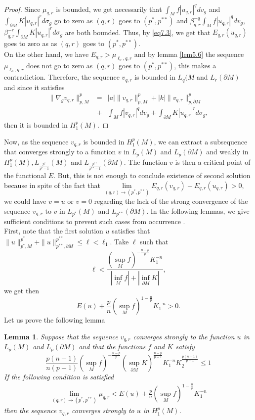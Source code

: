 \documentclass{Tran-l}
\newtheorem{lem}[thm]{Lemma}
\theoremstyle{definition}
\theoremstyle{remark}
\numberwithin{equation}{section}
\begin{document}
\begin{proof}
Since $\mu_{q,r}$ is bounded, we get necessarily that
$\int_Mf|u_{q,r}|^qdv_g$  and $\int_{\partial
M}K|u_{q,r}|^rd\sigma_g$ go to zero  as $(q,r)$ goes to
$(p^*,p^{**})$ and $\beta_{q,r}^{-q}\int_Mf|u_{q,r}|^qdv_g$,
$\beta_{q,r}^{-r}\int_{\partial M}K|u_{q,r}|^rd\sigma_g$ are both
bounded. Thus, by \eqref{eq7.3}, we get that $E_{q,r}(u_{q,r})$ goes
to zero as as $(q,r)$ goes to $(p^*,p^{**})$.\\
On the other hand, we have $E_{q,r}>\mu_{\ell_o,q,r}$ and by lemma
\ref{lem5.6} the sequence $\mu_{\ell_o,q,r}$ does not go to zero as
$(q,r)$ goes to $(p^*,p^{**})$, this makes a contradiction.
Therefore, the sequence $v_{q,r}$ is bounded in $L_q(M$ and
$L_r(\partial M)$ and since it satisfies
\begin{eqnarray*}
\|\nabla_gv_{q,r}\|_{p,M}^p&=&
|a|\|v_{q,r}\|_{p,M}^p+|k|\|v_{q,r}\|_{p,\partial M}^p\\&+&
\int_Mf|v_{q,r}|^qdv_g+\int_{\partial M}K|u_{q,r}|^rd\sigma_g,
\end{eqnarray*}
then it is bounded in $H^p_1(M)$.
\end{proof}
Now, as the sequence $v_{q,r}$ is bounded in $H^p_1(M)$, we can
extract a subsequence that converges strongly to a function $v$ in
$L_p(M)$ and $L_p(\partial M)$ and weakly in $ H^p_1(M),
L_{\frac{p^*}{p^{*}-1}}(M)$ and
$L_{\frac{p^{**}}{p^{**}-1}}(\partial M)$. The function $v$ is then
a critical point of the functional $E$. But, this is not enough to
conclude existence of second solution because in spite of the fact
that $\underset{(q,r)\rightarrow(p^*,p^{**})}\lim
E_{q,r}(v_{q,r})-E_{q,r}(u_{q,r})>0$, we could have $v=u$ or $v=0$
regarding the lack of the strong convergence of the sequence
$v_{q,r}$ to $v$ in $L_{p^*}(M)$ and $L_{p^{**}}(\partial M)$. In
the following lemmas, we give sufficient conditions to
prevent such cases from occurrence .\\
First, note that the first solution $u$ satisfies that
$\|u\|_{p^*,M}^{p^*}+\|u\|_{p^{**},\partial
M}^{p^{**}}\leq\ell<\ell_1$. Take $\ell$ such that
\begin{equation*}
\ell<\frac{(\sup_Mf)^{-\frac{n-p}{p}}K_1^{-n}}{|\inf_Mf|+|\inf_{\partial
M}K|},
\end{equation*}
we get then
\begin{equation*}
E(u)+\frac{p}{n}\left (\sup_Mf\right)^{1-\frac{n}{p}}K_1^{-n}>0.
\end{equation*}
Let us prove the following lemma
\begin{lem}\label{lem6.2}
Suppose that the sequence $v_{q,r}$ converges strongly to the
function $u$ in $L_p(M)$ and $L_p(\partial M)$ and that the
functions $f$ and $K$ satisfy
\begin{equation*}
\frac{p(n-1)}{n(p-1)}(\sup_Mf)^{-\frac{n-p}{p}}(\sup_{\partial
M}K)^\frac{n-p}{p-1}K_1^{-n}K_2^{\frac{p(n-1)}{p-1}}\le1
\end{equation*}
If the following condition is satisfied
\begin{eqnarray}\label{eqt6.4}
\underset{(q,r)\rightarrow(p^*,p^{**})}\lim\mu_{q,r}<E(u)+\frac{p}{n}\left
(\sup_Mf\right)^{1-\frac{n}{p}}K_1^{-n}
\end{eqnarray}
then the sequence  $v_{q,r}$ converges strongly to $u$ in
$H^p_1(M)$.
\end{lem}
\end{document}
